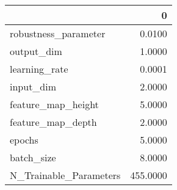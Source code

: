 \begin{tabular}{lr}
\toprule
{} &         0 \\
\midrule
robustness\_parameter   &    0.0100 \\
output\_dim             &    1.0000 \\
learning\_rate          &    0.0001 \\
input\_dim              &    2.0000 \\
feature\_map\_height     &    5.0000 \\
feature\_map\_depth      &    2.0000 \\
epochs                 &    5.0000 \\
batch\_size             &    8.0000 \\
N\_Trainable\_Parameters &  455.0000 \\
\bottomrule
\end{tabular}
